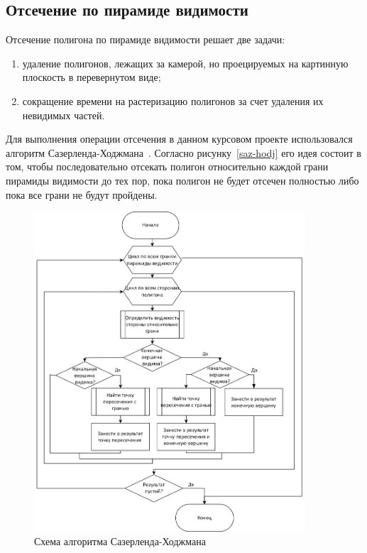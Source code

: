 \subsection{Отсечение по пирамиде видимости}

Отсечение полигона по пирамиде видимости решает две задачи:
\begin{enumerate}
	\item удаление полигонов, лежащих за камерой, но проецируемых на картинную плоскость в перевернутом виде;
	\item сокращение времени на растеризацию полигонов за счет удаления их невидимых частей.
\end{enumerate}

Для выполнения операции отсечения в данном курсовом проекте использовался алгоритм Сазерленда-Ходжмана~\cite{roders}. Согласно рисунку~\ref{saz-hodj} его идея состоит в том, чтобы последовательно отсекать полигон относительно каждой грани пирамиды видимости до тех пор, пока полигон не будет отсечен полностью либо пока все грани не будут пройдены.

\begin{figure}[h]
	\centering
	\includegraphics[width=0.9\textwidth]{img/sаz-hodj.png}
	\caption{Схема алгоритма Сазерленда-Ходжмана}
	\label{fig:saz-hodj}
\end{figure}

